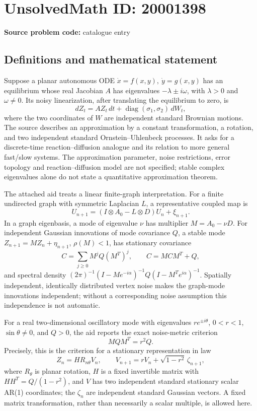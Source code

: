 \documentclass[11pt]{article}
\begin{document}
\section*{UnsolvedMath ID: 20001398}
\textbf{Source problem code:} catalogue entry
\subsection{Definitions and mathematical statement}
Suppose a planar autonomous ODE \(\dot x=f(x,y),\ \dot y=g(x,y)\) has an equilibrium whose real Jacobian \(A\) has eigenvalues \(-\lambda\pm i\omega\), with \(\lambda>0\) and \(\omega\ne0\). Its noisy linearization, after translating the equilibrium to zero, is
\[
 dZ_t=A Z_t\,dt+\operatorname{diag}(\sigma_1,\sigma_2)\,dW_t,
\]
where the two coordinates of \(W\) are independent standard Brownian motions. The source describes an approximation by a constant transformation, a rotation, and two independent standard Ornstein--Uhlenbeck processes. It asks for a discrete-time reaction--diffusion analogue and its relation to more general fast/slow systems. The approximation parameter, noise restrictions, error topology and reaction--diffusion model are not specified; stable complex eigenvalues alone do not state a quantitative approximation theorem.

The attached aid treats a linear finite-graph interpretation. For a finite undirected graph with symmetric Laplacian \(L\), a representative coupled map is
\[
 U_{n+1}=(I\otimes A_0-L\otimes D)U_n+\xi_{n+1}.
\]
In a graph eigenbasis, a mode of eigenvalue \(\nu\) has multiplier \(M=A_0-\nu D\). For independent Gaussian innovations of mode covariance \(Q\), a stable mode \(Z_{n+1}=MZ_n+\eta_{n+1}\), \(\rho(M)<1\), has stationary covariance
\[
 C=\sum_{j\ge0}M^jQ(M^T)^j,
 \qquad C=MCM^T+Q,
\]
and spectral density \((2\pi)^{-1}(I-Me^{-i\alpha})^{-1}Q(I-M^Te^{i\alpha})^{-1}\). Spatially independent, identically distributed vertex noise makes the graph-mode innovations independent; without a corresponding noise assumption this independence is not automatic.

For a real two-dimensional oscillatory mode with eigenvalues \(re^{\pm i\theta}\), \(0<r<1\), \(\sin\theta\ne0\), and \(Q>0\), the aid reports the exact noise-metric criterion
\[
 MQM^T=r^2Q.
\]
Precisely, this is the criterion for a stationary representation in law
\[
 Z_n=H R_{n\theta}V_n,\qquad
 V_{n+1}=rV_n+\sqrt{1-r^2}\,\zeta_{n+1},
\]
where \(R_\theta\) is planar rotation, \(H\) is a fixed invertible matrix with \(HH^T=Q/(1-r^2)\), and \(V\) has two independent standard stationary scalar AR(1) coordinates; the \(\zeta_n\) are independent standard Gaussian vectors. A fixed matrix transformation, rather than necessarily a scalar multiple, is allowed here.
\end{document}

